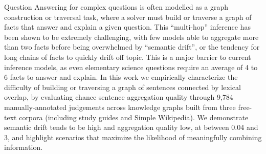 Question Answering for complex questions is often modelled as a graph construction or traversal task, where a solver must build or traverse a graph of facts that answer and explain a given question.  This ``multi-hop'' inference has been shown to be extremely challenging, with few models able to aggregate more than two facts before being overwhelmed by ``semantic drift'', or the tendency for long chains of facts to quickly drift off topic.  This is a major barrier to current inference models, as even elementary science questions require an average of 4 to 6 facts to answer and explain. In this work we empirically characterize the difficulty of building or traversing a graph of sentences connected by lexical overlap, by evaluating chance sentence aggregation quality through 9,784 manually-annotated judgements across knowledge graphs built from three free-text corpora (including study guides and Simple Wikipedia). We demonstrate semantic drift tends to be high and aggregation quality low, at between 0.04 and 3, and highlight scenarios that maximize the likelihood of meaningfully combining information.
